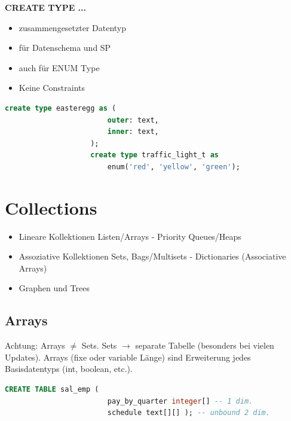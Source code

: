 \documentclass[a4paper, landscape, 8pt]{scrartcl}
\begin{document}
\begin{multicols*}{4}
\begin{multicols*}{2}
            \columnbreak

            \textbf{CREATE TYPE ...}
            \begin{itemize}
                \item zusammengesetzter Datentyp
                \item für Datenschema und SP
                \item auch für ENUM Type
                \item Keine Constraints
            \end{itemize}
            \begin{lstlisting}[language=sql]
                    create type easteregg as (
                        outer: text,
                        inner: text,
                    );
                    create type traffic_light_t as
                        enum('red', 'yellow', 'green');
            \end{lstlisting}
        \end{multicols*}

        \section{Collections}
        \begin{itemize}
            \item Lineare Kollektionen
            \subitem Listen/Arrays - Priority Queues/Heaps
            \item Assoziative Kollektionen
            \subitem Sets, Bags/Multisets - Dictionaries (Associative Arrays)
            \item Graphen und Trees
        \end{itemize}

        \subsection{Arrays}
        Achtung: Arrays $\neq$ Sets.
        Sets $\to$ separate Tabelle (besonders bei vielen Updates).
        Arrays (fixe oder variable Länge) sind Erweiterung jedes Basisdatentyps (int, boolean, etc.).

        \begin{lstlisting}[language=sql]
                    CREATE TABLE sal_emp (
                        pay_by_quarter integer[] -- 1 dim.
                        schedule text[][] ); -- unbound 2 dim.
        \end{lstlisting}


\end{multicols*}
\end{document}
